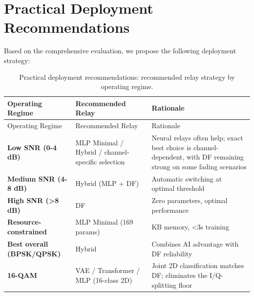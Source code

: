 \section{Practical Deployment Recommendations}\label{sec:practical-deployment-recommendations}

Based on the comprehensive evaluation, we propose the following deployment strategy:

\begin{longtable}[]{@{}
  >{\raggedright\arraybackslash}p{}
  >{\raggedright\arraybackslash}p{}
  >{\raggedright\arraybackslash}p{}@{}}
\caption{Practical deployment recommendations: recommended relay strategy by operating regime.}\label{tbl:table32}\tabularnewline
\toprule\noalign{}
\begin{minipage}[b]{\linewidth}\raggedright
Operating Regime
\end{minipage} & \begin{minipage}[b]{\linewidth}\raggedright
Recommended Relay
\end{minipage} & \begin{minipage}[b]{\linewidth}\raggedright
Rationale
\end{minipage} \\
\midrule\noalign{}
\endfirsthead
\toprule\noalign{}
\begin{minipage}[b]{\linewidth}\raggedright
Operating Regime
\end{minipage} & \begin{minipage}[b]{\linewidth}\raggedright
Recommended Relay
\end{minipage} & \begin{minipage}[b]{\linewidth}\raggedright
Rationale
\end{minipage} \\
\midrule\noalign{}
\endhead
\bottomrule\noalign{}
\endlastfoot
\textbf{Low SNR (0-4 dB)} & MLP Minimal / Hybrid / channel-specific selection & Neural relays often help; exact best choice is channel-dependent, with DF remaining strong on some fading scenarios \\
\textbf{Medium SNR (4-8 dB)} & Hybrid (MLP + DF) & Automatic switching at optimal threshold \\
\textbf{High SNR (\textgreater8 dB)} & DF & Zero parameters, optimal performance \\
\textbf{Resource-constrained} & MLP Minimal (169 params) & 0.7 KB memory, \textless3s training \\
\textbf{Best overall (BPSK/QPSK)} & Hybrid & Combines AI advantage with DF reliability \\
\textbf{16-QAM} & VAE / Transformer / MLP (16-class 2D) & Joint 2D classification matches DF; eliminates the I/Q-splitting floor \\
\end{longtable}

